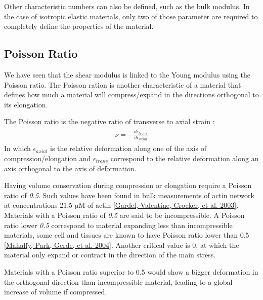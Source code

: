 \documentclass[A4paperpaper,11pt,english]{sphinxmanual}
\begin{document}
Other characteristic numbers can also be defined, such as the bulk modulus. In the case of isotropic
elastic materials, only two of those parameter are required to completely define
the properties of the material.


\subsection{Poisson Ratio}
\label{index-latex:poisson-ratio}
We have seen that the shear modulus is linked to the Young modulus using
the Poisson ratio.  The Poisson ration is another characteristic of a material
that defines how much a material will compress/expand in the directions
orthogonal to its elongation.

The Poisson ratio is the negative ratio of transverse to axial strain :
\label{index-latex:equation-eqa10}\begin{gather}
\begin{split}\nu = - \frac{
    d \epsilon_{trans}
}{
    d \epsilon_{axial}
}\end{split}\label{index-latex-eqa10}
\end{gather}
In which \(\epsilon_{axial}\) is the relative deformation along one of the
axis of compression/elongation and \(\epsilon_{trans}\) correspond to the
relative deformation along an axis orthogonal to the axis of deformation.

Having volume conservation during compression or elongation require
a Poisson ratio of \emph{0.5}. Such values have been found in bulk measurements of
actin network at concentrations 21.5 µM of actin {\hyperref[index-latex:gardel2003]{{[}Gardel, Valentine, Crocker,  et al.  2003{]}}}. Materials with a Poisson ratio of \emph{0.5} are
said to be incompressible. A Poisson ratio lower \emph{0.5} correspond to material
expanding less than incompressible materials, some cell and tissues are known to
have Poisson ratio lower than 0.5 {\hyperref[index-latex:mahaffy2004]{{[}Mahaffy, Park, Gerde,  et al.  2004{]}}}. Another critical value
is 0, at which the material only expand or contract in the direction of the
main stress.

Materials with a Poisson ratio superior to 0.5 would show a bigger
deformation in the orthogonal direction than incompressible material, leading
to a global increase of volume if compressed.
\end{document}
